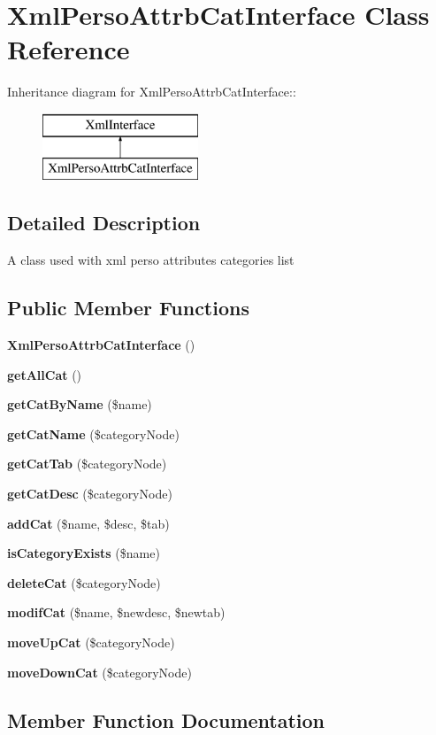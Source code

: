 \section{XmlPersoAttrbCatInterface Class Reference}
\label{classXmlPersoAttrbCatInterface}
Inheritance diagram for XmlPersoAttrbCatInterface::\begin{figure}[H]
\begin{center}
\leavevmode
\includegraphics[height=2cm]{classXmlPersoAttrbCatInterface}
\end{center}
\end{figure}


\subsection{Detailed Description}
A class used with xml perso attributes categories list 

\subsection*{Public Member Functions}
\begin{CompactItemize}
\item 
{\bf XmlPersoAttrbCatInterface} ()
\item 
{\bf getAllCat} ()
\item 
{\bf getCatByName} (\$name)
\item 
{\bf getCatName} (\$categoryNode)
\item 
{\bf getCatTab} (\$categoryNode)
\item 
{\bf getCatDesc} (\$categoryNode)
\item 
{\bf addCat} (\$name, \$desc, \$tab)
\item 
{\bf isCategoryExists} (\$name)
\item 
{\bf deleteCat} (\$categoryNode)
\item 
{\bf modifCat} (\$name, \$newdesc, \$newtab)
\item 
{\bf moveUpCat} (\$categoryNode)
\item 
{\bf moveDownCat} (\$categoryNode)
\end{CompactItemize}


\subsection{Member Function Documentation}
